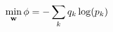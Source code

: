 \vspace{-0.1cm}
\begin{equation}
    \min_{\mathbf{w}} \phi = - \sum_k q_k\log(p_k)
    \label{eq:training-problem}
    \vspace{-0.05cm}
\end{equation}
